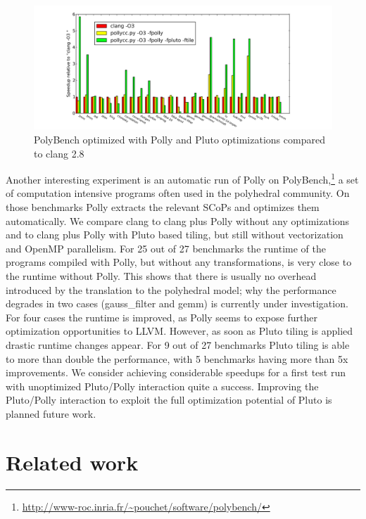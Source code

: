 \documentclass{acm_proc_article-sp}
\begin{document}
\begin{figure}
\begin{center}
\includegraphics[height=0.28\textheight]{images/polybench}
\end{center}
\caption{PolyBench optimized with Polly and Pluto optimizations compared to clang 2.8}
\label{polybench}
\end{figure}
Another interesting experiment is an automatic run of \mbox{Polly} on
PolyBench,\footnote{\url{http://www-roc.inria.fr/~pouchet/software/polybench/}}
a set of computation intensive programs often used in the polyhedral
community.  On those benchmarks Polly extracts the relevant SCoPs and
optimizes them automatically. We compare clang to clang plus Polly
without any optimizations and to clang plus Polly with Pluto based
tiling, but still without vectorization and OpenMP parallelism.
For 25 out of 27 benchmarks the runtime of the programs
compiled with Polly, but without any transformations, is very close to
the runtime without Polly.  This shows that there is usually no
overhead introduced by the translation to the polyhedral model; why
the performance degrades in two cases (gauss\_filter and gemm) is
currently under investigation.  For four cases the runtime is
improved, as Polly seems to expose further optimization opportunities
to LLVM.  However, as soon as Pluto tiling is applied drastic runtime
changes appear. For 9 out of 27 benchmarks Pluto tiling is able to
more than double the performance, with 5 benchmarks having more than
5x improvements.  We consider achieving considerable speedups for a
first test run with unoptimized Pluto/Polly interaction quite a
success. Improving the Pluto/Polly interaction to exploit the full
optimization potential of Pluto is planned future work.


\section{Related work}
\end{document}
